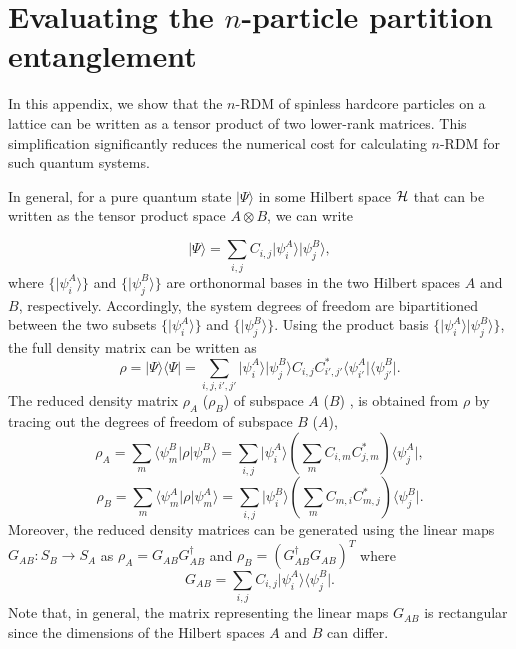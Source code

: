\label{appendix:appB}
\section{Evaluating the $n$-particle partition entanglement}

In this appendix, we show that the $n$-RDM of spinless hardcore particles on
a lattice can be written as a tensor product of two lower-rank matrices. This
simplification significantly reduces the numerical cost for calculating $n$-RDM
for such quantum systems. 

In general, for a pure quantum state $\vert \Psi\rangle$ in some
Hilbert space $\cal H$ that can be written as the tensor product space $A \otimes
B$, we can write

\begin{equation}
 \vert \Psi\rangle = \sum_{i,j} C_{i,j} \vert \psi^A_i\rangle  \vert \psi^B_j\rangle
\label{state_decomposition},
\end{equation}
where $\{\vert \psi^A_i\rangle\}$ and $\{\vert \psi^B_j\rangle\}$ are
orthonormal bases in the two Hilbert spaces $A$ and $B$, respectively.
Accordingly, the system degrees of freedom are bipartitioned between the two
subsets  $\{\vert \psi^A_i\rangle\}$ and $\{\vert \psi^B_j\rangle\}$. Using the
product basis $\{\vert \psi^A_i\rangle\vert  \psi^B_j\rangle\}$, the full
density matrix can be written as \begin{equation}
\rho=\vert \Psi\rangle\langle\Psi\vert = \sum_{i,j,i',j'}  \vert \psi^A_i\rangle  \vert \psi^B_j\rangle C_{i,j}C^*_{i',j'} \langle\psi^A_{i'}\vert \langle\psi^B_{j'}\vert 
\label{full_density_matrix}.
\end{equation}
The reduced density matrix $\rho_A$ ($\rho_B$) of subspace $A$ ($B$) , is obtained from $\rho$ by tracing out the degrees of freedom of subspace $B$ ($A$), 
\begin{equation}
\rho_A=\sum_{m}\langle\psi^B_m\vert \rho \vert \psi^B_m\rangle= \sum_{i,j}  \vert \psi^A_i\rangle \left(\sum_{m}C_{i,m}C^*_{j,m}\right) \langle\psi^A_{j}\vert 
\label{rho_1_full},
\end{equation}
\begin{equation}
\rho_B=\sum_{m}\langle\psi^A_m\vert \rho \vert \psi^A_m\rangle= \sum_{i,j}  \vert \psi^B_i\rangle \left(\sum_{m}C_{m,i}C^*_{m,j}\right) \langle\psi^B_{j}\vert 
\label{rho_2_full}.
\end{equation}
 Moreover,  the reduced density matrices can be generated using the linear maps $G_{AB}:S_B\rightarrow S_A$ as  $\rho_A=G_{AB}G_{AB}^\dagger$ and $\rho_B=(G_{AB}^\dagger G_{AB})^T$
where
\begin{equation}
G_{AB}=\sum_{i,j}C_{i,j}\vert \psi^A_i\rangle\langle\psi^B_j\vert 
\label{D_1}.
\end{equation}
Note that, in general, the matrix representing the linear maps $G_{AB}$ is
rectangular since the dimensions of the Hilbert spaces $A$ and $B$ can differ.

